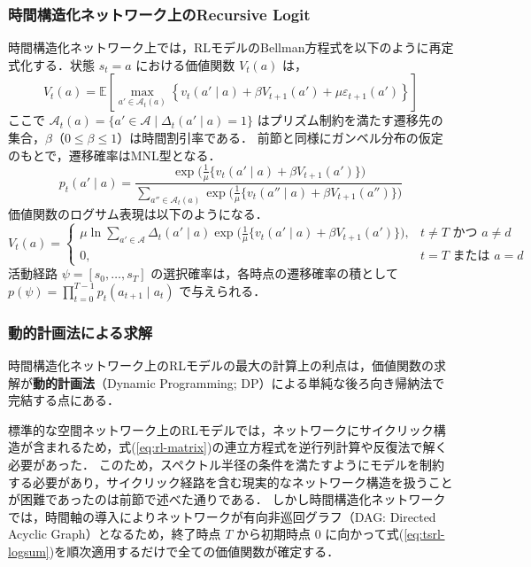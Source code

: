 \subsubsection{時間構造化ネットワーク上のRecursive Logit}
時間構造化ネットワーク上では，RLモデルのBellman方程式を以下のように再定式化する．状態 $s_t = a$ における価値関数 $V_t(a)$ は，
\begin{equation}\label{eq:tsrl-bellman}
  V_t(a) = \mathbb{E}\left[\max_{a' \in \mathcal{A}_t(a)} \left\{ v_t(a' \mid a) + \beta V_{t+1}(a') + \mu \varepsilon_{t+1}(a') \right\} \right]
\end{equation}
ここで $\mathcal{A}_t(a) = \{a' \in \mathcal{A} \mid \Delta_t(a' \mid a) = 1\}$ はプリズム制約を満たす遷移先の集合，$\beta$（$0 \leq \beta \leq 1$）は時間割引率である．
前節と同様にガンベル分布の仮定のもとで，遷移確率はMNL型となる．
\begin{equation}\label{eq:tsrl-prob}
  p_t(a' \mid a) = \frac{\exp\bigl(\frac{1}{\mu}\{v_t(a' \mid a) + \beta V_{t+1}(a')\}\bigr)}{\displaystyle\sum_{a'' \in \mathcal{A}_t(a)} \exp\bigl(\frac{1}{\mu}\{v_t(a'' \mid a) + \beta V_{t+1}(a'')\}\bigr)}
\end{equation}
価値関数のログサム表現は以下のようになる．
\begin{equation}\label{eq:tsrl-logsum}
  V_t(a) = \begin{cases}
    \mu \ln \displaystyle\sum_{a' \in \mathcal{A}} \Delta_t(a' \mid a) \exp\bigl(\frac{1}{\mu}\{v_t(a' \mid a) + \beta V_{t+1}(a')\}\bigr), & t \neq T \text{ かつ } a \neq d \\
    0, & t = T \text{ または } a = d
  \end{cases}
\end{equation}
活動経路 $\psi = [s_0, \ldots, s_T]$ の選択確率は，各時点の遷移確率の積として $p(\psi) = \prod_{t=0}^{T-1} p_t(a_{t+1} \mid a_t)$ で与えられる．

\subsubsection{動的計画法による求解}
時間構造化ネットワーク上のRLモデルの最大の計算上の利点は，価値関数の求解が\textbf{動的計画法}（Dynamic Programming; DP）による単純な後ろ向き帰納法で完結する点にある．

標準的な空間ネットワーク上のRLモデルでは，ネットワークにサイクリック構造が含まれるため，式(\ref{eq:rl-matrix})の連立方程式を逆行列計算や反復法で解く必要があった．
このため，スペクトル半径の条件を満たすようにモデルを制約する必要があり，サイクリック経路を含む現実的なネットワーク構造を扱うことが困難であったのは前節で述べた通りである．
しかし時間構造化ネットワークでは，時間軸の導入によりネットワークが有向非巡回グラフ（DAG: Directed Acyclic Graph）となるため，終了時点 $T$ から初期時点 $0$ に向かって式(\ref{eq:tsrl-logsum})を順次適用するだけで全ての価値関数が確定する．

